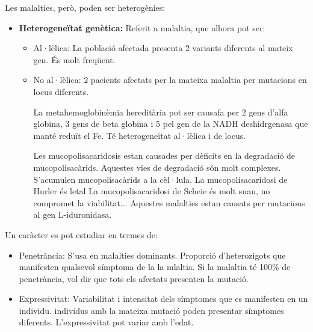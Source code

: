 Les malalties, però, poden ser heterogènies:
\begin{itemize}
\item \textbf{Heterogeneïtat genètica:} Referit a malaltia, que alhora pot ser:
  \begin{itemize}
  \item Al·lèlica: La població afectada presenta 2 variants diferents al mateix gen. És molt freqüent.
  \item No al·lèlica: 2 pacients afectats per la mateixa malaltia per mutacions en locus diferents. 

La metahemoglobinèmia hereditària pot ser causafa per 2 gens d'alfa globina, 3 gens de beta globina i 5 pel gen de la NADH deshidrgenasa que manté reduït el Fe. Té heterogeneïtat al·lèlica i de locus.

Les mucopolisacaridosis estan causades per dèficits en la degradació de mucopolisacàrids. Aquestes vies de degradació són molt complexes. S'acumulen mucopolisacàrids a la cèl·lula. La mucopolisacaridosi de Hurler és letal La mucopolisacaridosi de Scheie és molt suau, no compromet la viabilitat... Aquestes malalties estan causats per mutacions al gen L-iduronidasa.
  \end{itemize}
\end{itemize}

Un caràcter es pot estudiar en termes de:
\begin{itemize}
\item Penetrància: S'usa en malalties dominants. Proporció d'heterozigots que manifesten qualsevol símptoma de la la mlaltia. Si la malaltia té 100\% de penetrància, vol dir que tots els afectats presenten la mutació.

\item Expressivitat: Variabilitat i intensitat dels símptomes que es manifesten en un individu. individus amb la mateixa mutació poden presentar símptomes diferents. L'expressivitat pot variar amb l'edat.
\end{itemize}
